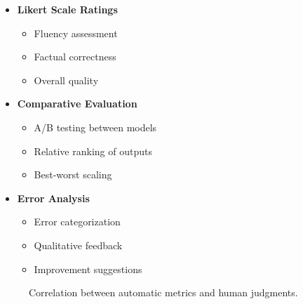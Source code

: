 \begin{itemize}
    \item \textbf{Likert Scale Ratings}
    \begin{itemize}
        \item Fluency assessment
        \item Factual correctness
        \item Overall quality
    \end{itemize}
    
    \item \textbf{Comparative Evaluation}
    \begin{itemize}
        \item A/B testing between models
        \item Relative ranking of outputs
        \item Best-worst scaling
    \end{itemize}
    
    \item \textbf{Error Analysis}
    \begin{itemize}
        \item Error categorization
        \item Qualitative feedback
        \item Improvement suggestions
    \end{itemize}
\end{itemize}

\begin{figure}[ht]
    \centering
    \caption{Correlation between automatic metrics and human judgments.}
    \label{fig:human_correlation}
\end{figure}

\nocite{zhang2020bertscore, sellam2020bleurt, papineni2002bleu, banerjee2005meteor}

